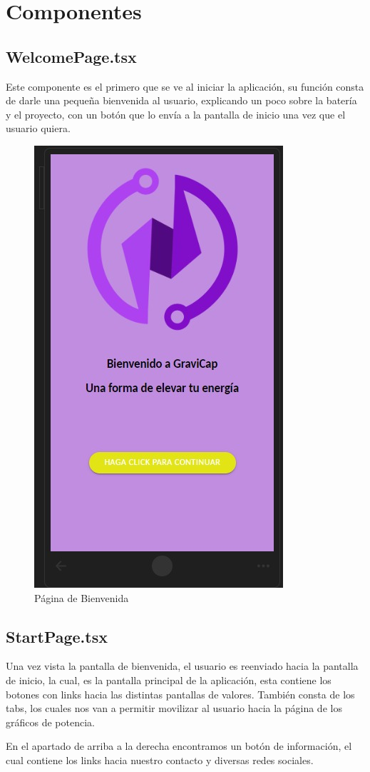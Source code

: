         \section{Componentes}
        
            \subsection{WelcomePage.tsx}
            
                Este componente es el primero que se ve al iniciar la aplicación, su función consta de darle una pequeña bienvenida al usuario, explicando un poco sobre la batería y el proyecto, con un botón que lo envía a la pantalla de inicio una vez que el usuario quiera.\par

                \begin{figure} [H]
                    \centering
                    \includegraphics[width=0.25\linewidth]{Aplicación/Welcome.png}
                    \caption{Página de Bienvenida}
                    \label{fig:a1}
                \end{figure}
                
            \subsection{StartPage.tsx}
                Una vez vista la pantalla de bienvenida, el usuario es reenviado hacia la pantalla de inicio, la cual, es la pantalla principal de la aplicación, esta contiene los botones con links hacia las distintas pantallas de valores. También consta de los tabs, los cuales nos van a permitir movilizar al usuario hacia la página de los gráficos de potencia.\par
                En el apartado de arriba a la derecha encontramos un botón de información, el cual contiene los links hacia nuestro contacto y diversas redes sociales.\par

